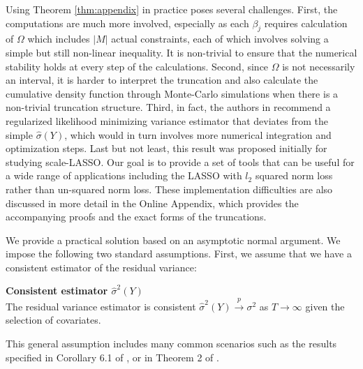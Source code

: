 \documentclass[11pt]{article}
\newcommand{\CP}{\stackrel{p}{\rightarrow}}
\begin{document}
Using Theorem \ref{thm:appendix} in practice poses several challenges. First, the computations are much more involved, especially as each $\beta_j$ requires calculation of $\Omega$ which includes $|M|$ actual constraints, each of which involves solving a simple but still non-linear inequality. It is non-trivial to ensure that the numerical stability holds at every step of the calculations. Second, since $\Omega$ is not necessarily an interval, it is harder to interpret the truncation and also calculate the cumulative density function through Monte-Carlo simulations when there is a non-trivial truncation structure. Third, in fact, the authors in \cite{tian2017selective} recommend a regularized likelihood minimizing variance estimator that deviates from the simple $\hat{\sigma}(Y)$, which would in turn involves more numerical integration and optimization steps. Last but not least, this result was proposed initially for studying scale-LASSO. Our goal is to provide a set of tools that can be useful for a wide range of applications including the LASSO with $l_2$ squared norm loss rather than un-squared norm loss. These implementation difficulties are also discussed in more detail in the Online Appendix, which provides the accompanying proofs and the exact forms of the truncations.

We provide a practical solution based on an asymptotic normal argument. We impose the following two standard assumptions. First, we assume that we have a consistent estimator of the residual variance:
\begin{assumption_app}{\bf Consistent estimator $\hat{\sigma}^2(Y)$} \label{asu_consist}\\
The residual variance estimator is consistent $\hat{\sigma}^2(Y)\CP\sigma^2$ as $T\to\infty$ given the selection of covariates.
\end{assumption_app}
This general assumption includes many common scenarios such as the results specified in Corollary 6.1 of \cite{BG}, or in Theorem 2 of \cite{chatterjee2014assumptionless}. 
\end{document}
